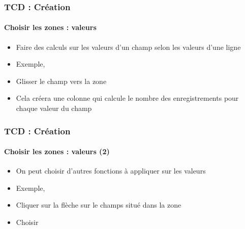 \documentclass[xcolor=table, usenames,dvipsnames]{beamer}
\begin{document}
\begin{frame}
\frametitle{TCD : Création}
\framesubtitle{Choisir les zones : valeurs}

\begin{minipage}{0.39\textwidth}
	\begin{itemize}
		\item Faire des calculs sur les valeurs d'un champ selon les valeurs d'une ligne
		\item Exemple, 
		\item Glisser le champ  vers la zone 
	\end{itemize}
\end{minipage}
%
\begin{minipage}{0.6\textwidth} 
\end{minipage}
\begin{itemize}
	\item Cela créera une colonne  qui calcule le nombre des enregistrements pour chaque valeur du champ 
\end{itemize}

\end{frame}

\begin{frame}
\frametitle{TCD : Création}
\framesubtitle{Choisir les zones : valeurs (2)}

\begin{itemize}
	\item On peut choisir d'autres fonctions à appliquer sur les valeurs
	\item Exemple, 
	\item Cliquer sur la flèche sur le champs situé dans la zone 
	\item Choisir 
\end{itemize}



\end{frame}
\end{document}
